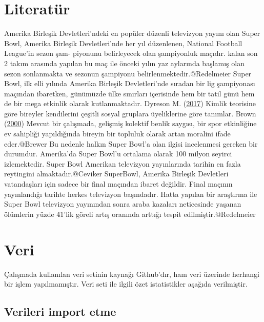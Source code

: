 \documentclass[
  12pt,
]{article}
\begin{document}
\hypertarget{literatuxfcr}{%
\section{Literatür}\label{literatuxfcr}}

Amerika Birleşik Devletleri'ndeki en popüler düzenli televizyon yayını olan Super Bowl, Amerika Birleşik Devletleri'nde her yıl düzenlenen, National Football League'in sezon şam- piyonunu belirleyecek olan şampiyonluk maçıdır. kalan son 2 takım arasında yapılan bu maç ile önceki yılın yaz aylarında başlamış olan sezon sonlanmakta ve sezonun şampiyonu belirlenmektedir.@Redelmeier Super Bowl, ilk elli yılında Amerika Birleşik Devletleri'nde sıradan bir lig şampiyonası maçından ibaretken, günümüzde ülke sınırları içerisinde hem bir tatil günü hem de bir mega etkinlik olarak kutlanmaktadır. Dyreson M. (\protect\hyperlink{ref-Hopsicker}{2017}) Kimlik teorisine göre bireyler kendilerini çeşitli sosyal gruplara üyeliklerine göre tanımlar. Brown (\protect\hyperlink{ref-Brown}{2000}) Mevcut bir çalışmada, gelişmiş kolektif benlik saygısı, bir spor etkinliğine ev sahipliği yapıldığında bireyin bir topluluk olarak artan moralini ifade eder.@Brewer Bu nedenle halkın Super Bowl'a olan ilgisi incelenmesi gereken bir durumdur. Amerika'da Super Bowl'u ortalama olarak 100 milyon seyirci izlemektedir. Super Bowl Amerikan televizyon yayınlarında tarihin en fazla reytingini almaktadır.@Ceviker SuperBowl, Amerika Birleşik Devletleri vatandaşları için sadece bir final maçından ibaret değildir. Final maçının yayınlandığı tarihte herkes televizyon başındadır. Hatta yapılan bir araştırma ile Super Bowl televizyon yayınından sonra araba kazaları neticesinde yaşanan ölümlerin yüzde 41'lik göreli artış oranında arttığı tespit edilmiştir.@Redelmeier

\hypertarget{veri}{%
\section{Veri}\label{veri}}

Çalışmada kullanılan veri setinin kaynağı Github'dır, ham veri üzerinde herhangi bir işlem yapılmamıştır. Veri seti ile ilgili özet istatistikler aşağıda verilmiştir.

\hypertarget{verileri-import-etme}{%
\subsection{Verileri import etme}\label{verileri-import-etme}}
\end{document}
